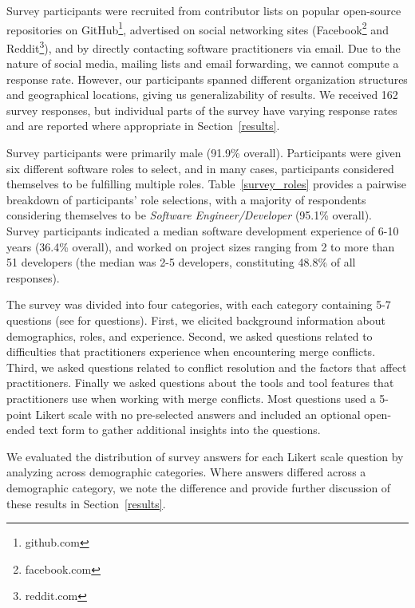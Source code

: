 \renewcommand*{\thefootnote}{\arabic{footnote}}
\setcounter{footnote}{0}
Survey participants were recruited from contributor lists on popular open-source repositories on GitHub\footnote{github.com}, advertised on social networking sites (Facebook\footnote{facebook.com} and Reddit\footnote{reddit.com}), and by directly contacting software practitioners via email. Due to the nature of social media, mailing lists and email forwarding, we cannot compute a response rate. However, our participants spanned different organization structures and geographical locations, giving us generalizability of results.
We received 162 survey responses, but individual parts of the survey have varying response rates and are reported where appropriate in Section~\ref{results}.


Survey participants were primarily male (91.9\% overall). 
Participants were given six different software roles to select, and in many cases, participants considered themselves to be fulfilling multiple roles. 
Table~\ref{survey_roles} provides a pairwise breakdown of participants' role selections, with a majority of respondents considering themselves to be \textit{Software Engineer/Developer} (95.1\% overall).
Survey participants indicated a median software development experience of 6-10 years (36.4\% overall), and worked on project sizes ranging from 2 to more than 51 developers (the median was 2-5 developers, constituting 48.8\% of all responses).

The survey was divided into four categories, with each category containing 5-7 questions (see \cite{companion_site} for questions).
First, we elicited background information about demographics, roles, and experience.
Second, we asked questions related to difficulties that practitioners experience when encountering merge conflicts.
Third, we asked questions related to conflict resolution and the factors that affect practitioners.
Finally we asked questions about the tools and tool features that practitioners use when working with merge conflicts.
Most questions used a 5-point Likert scale with no pre-selected answers and included an optional open-ended text form to gather additional insights into the questions. 

 We evaluated the distribution of survey answers for each Likert scale question by analyzing across demographic categories.
Where answers differed across a demographic category, we note the difference and provide further discussion of these results in Section~\ref{results}.

